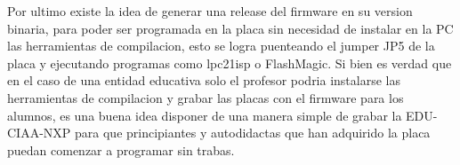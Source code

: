 Por ultimo existe la idea de generar una release del firmware en su version binaria, para poder ser programada en la placa sin necesidad de instalar en la PC las herramientas de compilacion, esto se logra puenteando el jumper JP5 de la placa y ejecutando programas como lpc21isp o FlashMagic. Si bien es verdad que en el caso de una entidad educativa solo el profesor podria instalarse las herramientas de compilacion y grabar las placas con el firmware para los alumnos, es una buena idea  disponer de una manera simple de grabar la EDU-CIAA-NXP para que principiantes y autodidactas que han adquirido la placa puedan comenzar a programar sin trabas.


 

